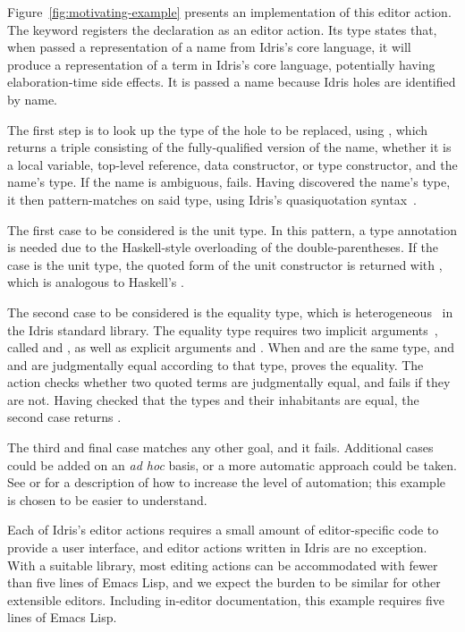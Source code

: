 Figure~\ref{fig:motivating-example} presents an implementation of this
editor action. The  keyword registers the declaration as
an editor action. Its type states that, when passed a representation
of a name from Idris's core language, it will produce a representation
of a term in Idris's core language, potentially having
elaboration-time side effects. It is passed a name because Idris holes
are identified by name.

The first step is to look up the type of the hole to be replaced,
using , which returns a triple consisting of the
fully-qualified version of the name, whether it is a local variable,
top-level reference, data constructor, or type constructor, and the
name's type. If the name is ambiguous,  fails.
Having discovered the name's type, it then pattern-matches on said
type, using Idris's quasiquotation syntax~\citep{idrisQuotation}.

The first case to be considered is the unit type. In this pattern, a
type annotation is needed due to the Haskell-style overloading of the
double-parentheses. If the case is the unit type, the quoted form of
the unit constructor is returned with , which is analogous to
Haskell's .

The second case to be considered is the equality type, which is
heterogeneous~\citep{mcbridephd} in the Idris standard library.  The
equality type requires two implicit arguments~\citep{pollack}, called
 and , as well as explicit arguments  and .
When  and  are the same type, and  and  are
judgmentally equal according to that type,  proves the
equality. The  action checks whether two quoted terms are
judgmentally equal, and fails if they are not. Having checked that the
types and their inhabitants are equal, the second case returns .

The third and final case matches any other goal, and it
fails. Additional cases could be added on an \emph{ad hoc} basis, or a
more automatic approach could be taken. See \citet{davidphd} or
\citet{elabref} for a description of how to increase the level of
automation; this example is chosen to be easier to understand.

Each of Idris's editor actions requires a small amount of
editor-specific code to provide a user interface, and editor actions
written in Idris are no exception. With a suitable library, most
editing actions can be accommodated with fewer than five lines of
Emacs Lisp, and we expect the burden to be similar for other
extensible editors. Including in-editor documentation, this example
requires five lines of Emacs Lisp.

